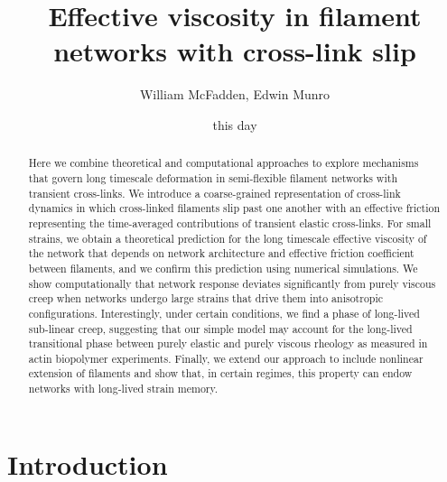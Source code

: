 \documentclass[pre,preprint]{revtex4-1}
\begin{document}
\title{Effective viscosity in filament networks with cross-link slip}
\author{William McFadden, Edwin Munro}

\date{this day}


\begin{abstract}
Here we combine theoretical and computational approaches to explore mechanisms that govern  long timescale deformation in semi-flexible filament networks with transient cross-links.  We introduce a coarse-grained representation of cross-link dynamics in which cross-linked filaments slip past one another with an effective friction representing the time-averaged contributions of transient elastic cross-links.  For small strains, we obtain a theoretical prediction for the long timescale effective viscosity of the network that depends on network architecture and effective friction coefficient between filaments, and we confirm this prediction using numerical simulations.  We show computationally that network response deviates significantly from purely viscous creep when networks undergo large strains that drive them into anisotropic configurations.  Interestingly, under certain conditions, we find a phase of long-lived sub-linear creep, suggesting that our simple model may account for the long-lived transitional phase between purely elastic and purely viscous rheology as measured in actin biopolymer experiments.  Finally, we extend our approach to include nonlinear extension of filaments and show that, in certain regimes, this property can endow networks with long-lived strain memory.
\end{abstract}



\maketitle


\tableofcontents


















\section{Introduction}
\end{document}
